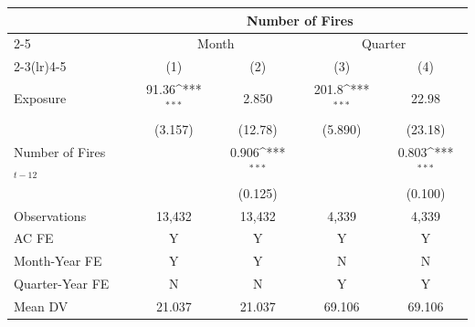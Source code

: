 {
\def\sym#1{\ifmmode^{#1}\else\(^{#1}\)\fi}
\begin{tabular}{l*{4}{c}}
\toprule
            &\multicolumn{4}{c}{Number of Fires}\\\cmidrule(lr){2-5}
            &\multicolumn{2}{c}{Month}&\multicolumn{2}{c}{Quarter}\\\cmidrule(lr){2-3}\cmidrule(lr){4-5}
            &\multicolumn{1}{c}{(1)}&\multicolumn{1}{c}{(2)}&\multicolumn{1}{c}{(3)}&\multicolumn{1}{c}{(4)}\\
\midrule
Exposure    &91.36\sym{***}&2.850&201.8\sym{***}&22.98\\
            &(3.157)&(12.78)&(5.890)&(23.18)\\
Number of Fires$_{t-12}$&&0.906\sym{***}&&0.803\sym{***}\\
            &&(0.125)&&(0.100)\\
\midrule
Observations&13,432&13,432&4,339&4,339\\
AC FE       &Y&Y&Y&Y\\
Month-Year FE&Y&Y&N&N\\
Quarter-Year FE&N&N&Y&Y\\
Mean DV     &21.037&21.037&69.106&69.106\\
\bottomrule
\end{tabular}
}
